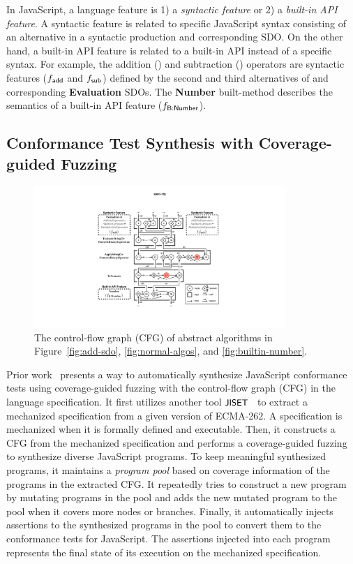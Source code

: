 In JavaScript, a language feature is 1) a \textit{syntactic feature} or 2) a
\textit{built-in API feature}.
%
A syntactic feature is related to specific JavaScript syntax consisting of an
alternative in a syntactic production and corresponding SDO.
%
On the other hand, a built-in API feature is related to a built-in API instead
of a specific syntax.
%
For example, the addition (\scode{+}) and subtraction (\scode{-}) operators are
syntactic features ($f_{\textsf{add}}$ and $f_{\textsf{sub}}$) defined by the second and third
alternatives of  and corresponding \textbf{Evaluation}
SDOs.
%
The \textbf{Number} built-method describes the semantics of a built-in
 API feature  ($f_{\textsf{B:Number}}$).


\subsection{Conformance Test Synthesis with Coverage-guided
Fuzzing}\label{sec:jest}

\begin{figure}
  \centering
  \includegraphics[width=0.85\textwidth]{img/spec-cfg}
  \caption{
    The control-flow graph (CFG) of abstract algorithms in
    Figure~\ref{fig:add-sdo}, \ref{fig:normal-algos}, and
    \ref{fig:builtin-number}.
  }
  \label{fig:spec-cfg}
\end{figure}

Prior work~\cite{jest} presents a way to automatically synthesize JavaScript
conformance tests using coverage-guided fuzzing with the control-flow graph
(CFG) in the language specification.
%
It first utilizes another tool $\textsf{\small JISET}$~\cite{jiset} to extract a mechanized
specification from a given version of ECMA-262.
%
A specification is mechanized when it is formally defined and executable.
%
Then, it constructs a CFG from the mechanized specification and performs
a coverage-guided fuzzing~\cite{afl} to synthesize diverse JavaScript programs.
%
To keep meaningful synthesized programs, it maintains a \textit{program pool}
based on coverage information of the programs in the extracted CFG.
%
It repeatedly tries to construct a new program by mutating programs in the pool
and adds the new mutated program to the pool when it covers more nodes or
branches.
%
Finally, it automatically injects assertions to the synthesized programs in the
pool to convert them to the conformance tests for JavaScript.
%
The assertions injected into each program represents the final state of its
execution on the mechanized specification.

